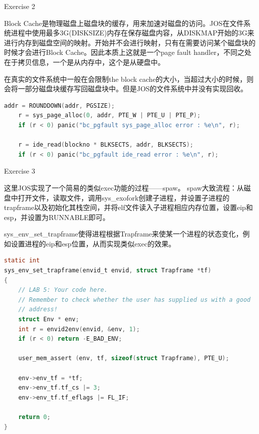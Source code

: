 \documentclass[GBK,winfonts,a4paper,10pt]{ctexart}
\begin{document}
\begin{section}{ Exercise 2 }
\par
Block Cache是物理磁盘上磁盘块的缓存，用来加速对磁盘的访问。JOS在文件系统进程中使用最多3G(DISKSIZE)内存在保存磁盘内容，从DISKMAP开始的3G来进行内存到磁盘空间的映射。开始并不会进行映射，只有在需要访问某个磁盘块的时候才会进行Block Cache。因此本质上这就是一个page fault handler，不同之处在于拷贝信息，一个是从内存中，这个是从硬盘中。
\par
在真实的文件系统中一般在会限制the block cache的大小，当超过大小的时候，则会将一部分磁盘块缓存写回磁盘块中。但是JOS的文件系统中并没有实现回收。
\begin{lstlisting}[language=C]
    	addr = ROUNDDOWN(addr, PGSIZE);
	r = sys_page_alloc(0, addr, PTE_W | PTE_U | PTE_P);
	if (r < 0) panic("bc_pgfault sys_page_alloc error : %e\n", r);

	r = ide_read(blockno * BLKSECTS, addr, BLKSECTS);
	if (r < 0) panic("bc_pgfault ide_read error : %e\n", r);       
\end{lstlisting}
\end{section}

\begin{section}{ Exercise 3 }
\par
这里JOS实现了一个简易的类似exec功能的过程——spaw。
spaw大致流程：从磁盘中打开文件，读取文件，调用sys\_exofork创建子进程，并设置子进程的trapframe以及初始化其栈空间，并将elf文件读入子进程相应内存位置，设置eip和esp，并设置为RUNNABLE即可。
\par
sys\_env\_set\_trapframe使得进程根据Trapframe来使某一个进程的状态变化，例如设置进程的eip和esp位置，从而实现类似exec的效果。
\begin{lstlisting}[language=C]      
static int
sys_env_set_trapframe(envid_t envid, struct Trapframe *tf)
{
	// LAB 5: Your code here.
	// Remember to check whether the user has supplied us with a good
	// address!
	struct Env * env;
	int r = envid2env(envid, &env, 1);
	if (r < 0) return -E_BAD_ENV;	

	user_mem_assert (env, tf, sizeof(struct Trapframe), PTE_U);

	env->env_tf = *tf;
	env->env_tf.tf_cs |= 3;
	env->env_tf.tf_eflags |= FL_IF;

	return 0;
}
\end{lstlisting}

\end{section}
\end{document}
